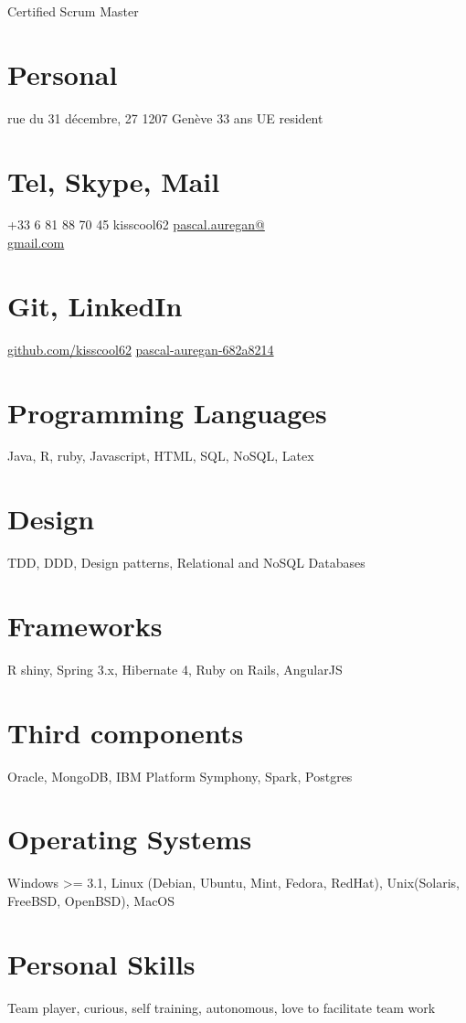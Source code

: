 \documentclass[]{bankcy}
\begin{document}
      {Certified Scrum Master}


      

\begin{aside}
  \section{Personal}
    rue du 31 décembre, 27
    1207 Genève
    33 ans    
    UE resident
    ~
  \section{Tel, Skype, Mail}
    +33 6 81 88 70 45
    kisscool62
    \href{mailto:pascal.auregan@gmail.com}{pascal.auregan@\\gmail.com}
    ~
  \section{Git, LinkedIn}
    \href{https://github.com/kisscool62}{github.com/kisscool62}
    \href{https://fr.linkedin.com/in/pascal-auregan-682a8214}{pascal-auregan-682a8214}
    ~
   \section{Programming Languages}
   Java, R, ruby, Javascript, HTML, SQL, NoSQL, Latex  
    ~
    \section{Design}
    TDD, DDD, Design patterns, Relational and NoSQL Databases
    ~
   \section{Frameworks}
    R shiny, Spring 3.x, Hibernate 4, Ruby on Rails, AngularJS  
    ~
    \section{Third components}
    Oracle, MongoDB, IBM Platform Symphony, Spark, Postgres
    ~
    \section{Operating Systems}
    Windows >= 3.1, Linux (Debian, Ubuntu, Mint, Fedora, RedHat), Unix(Solaris, FreeBSD, OpenBSD), MacOS
    ~
  \section{Personal Skills}
  Team player, curious, self training, autonomous, love to facilitate team work
    ~
\end{aside}
\end{document}
